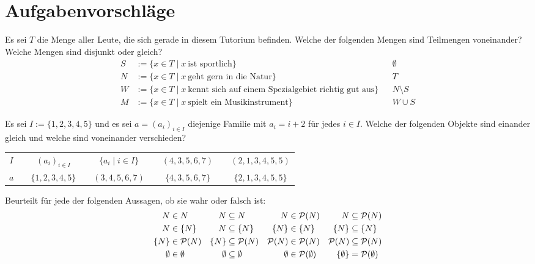 \clearpage
\section{Aufgabenvorschläge}


\begin{aufg}[Kennenlernen]
    Es sei $T$ die Menge aller Leute, die sich gerade in diesem Tutorium befinden.
    Welche der folgenden Mengen sind Teilmengen voneinander? Welche Mengen sind disjunkt oder gleich?
    \begin{align*}
        S&:= \{ x\in T \mid x\ \text{ist sportlich} \}  && \emptyset  \\
        N&:=  \{ x\in T \mid x\ \text{geht gern in die Natur} \} && T \\
        W & := \{ x\in T \mid x\ \text{kennt sich auf einem Spezialgebiet richtig gut aus} \} &&  N\setminus S  \\
        M &:= \{ x \in T \mid x\ \text{spielt ein Musikinstrument} \} && W \cup S
    \end{align*}
\end{aufg}


\begin{aufg} \label{aufg:mengenvsfamilien}
    Es sei $I:=\{1,2,3,4,5\}$ und es sei $a=(a_i)_{i\in I}$ diejenige Familie mit $a_i=i+2$ für jedes $i\in I$. Welche der folgenden Objekte sind einander gleich und welche sind voneinander verschieden?
    \begin{center}
    {\renewcommand{\arraystretch}{1.6}
    \begin{tabular}{ccccccccc}
        $I$ && $(a_i)_{i\in I}$&& $\{a_i\mid i\in I\}$ && $(4,3,5,6,7)$ && $(2,1,3,4,5,5)$ \\
        $a$ && $\{1,2,3,4,5\}$ && $(3,4,5,6,7)$ && $\{4,3,5,6,7\}$ && $\{2,1,3,4,5,5\}$
	\end{tabular}}
    \end{center}
\end{aufg}


\begin{aufg} \label{aufg:elemente}
    Beurteilt für jede der folgenden Aussagen, ob sie wahr oder falsch ist:
    \begin{align*}
        \relax N&  \in \relax N & \relax N & \subseteq \relax N & \relax N & \in \mathcal P(\relax N) &  \relax N & \subseteq \mathcal P(\relax N) \\
        \relax N & \in \{ \relax N\} & \relax N & \subseteq \{ \relax N\} & \{ \relax N\} & \in \{ \relax N\} & \{\relax N\} & \subseteq \{ \relax N\} \\
        \{\relax N\} & \in \mathcal P(\relax N) & \{ \relax N\} & \subseteq \mathcal P(\relax N) & \mathcal P(\relax N) & \in \mathcal P(\relax N) & \mathcal P(\relax N) & \subseteq \mathcal P(\relax N) \\
        \emptyset & \in \emptyset & \emptyset &\subseteq \emptyset & \emptyset & \in \mathcal P(\emptyset) & \{\emptyset\} & = \mathcal P(\emptyset)
    \end{align*}
\end{aufg}


